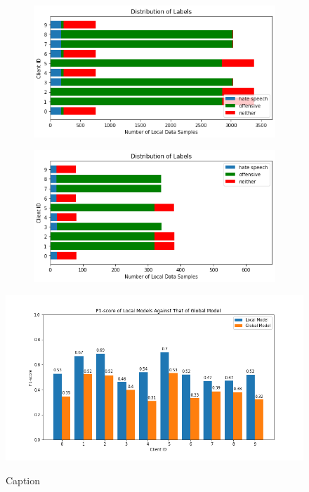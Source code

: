 \documentclass[letterpaper]{article} %
\begin{document}
\begin{figure}[hbt!]

\begin{subfigure}{\columnwidth}
{\includegraphics[width=\columnwidth]{noniid-quantity-based-label-imbalance-2_distribution_of_labels_2}}
\caption{}
\end{subfigure}

\begin{subfigure}{\columnwidth}
{\includegraphics[width=\columnwidth]{noniid-quantity-based-label-imbalance-2_test_set_distribution_of_labels_2}}
\caption{}
\end{subfigure}

\caption{}
\end{figure}

\begin{figure}[hbt!]
{\includegraphics[width=\columnwidth]{noniid-quantity-based-label-imbalance-2_seed_2performance_of_local_models_f1score}}
\caption{Caption}
\end{figure}
\end{document}
